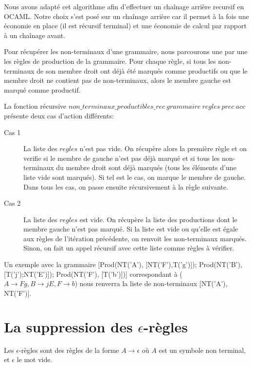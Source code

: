\documentclass[11pt,a4paper]{article}
\begin{document}
Nous avons adapté cet algorithme afin d'effectuer un chaînage arrière recursif en OCAML. Notre choix s'est posé sur un chaînage arrière car il permet à la fois une économie en place (il est récursif terminal) et une économie de calcul par rapport à un chaînage avant.
\newline

Pour récupérer les non-terminaux d'une grammaire, nous parcourons une par une les règles 
de production de la grammaire. Pour chaque règle, si tous les non-terminaux de son membre droit ont déjà  été marqués comme productifs ou que le membre droit ne contient pas de non-terminaux, alors le membre gauche est marqué comme productif.

La fonction récursive $non\_terminaux\_productibles\_rec\ grammaire\ regles\ prec\ acc$ présente deux cas d'action différents:

\begin{description}
    \item[Cas 1] La liste des $regles$ n'est pas vide. On récupère alors la première règle et on verifie si le membre de gauche n'est pas déjà marqué et si tous les non-terminaux du membre droit sont déjà marqués (tous les éléments d'une liste vide sont marqués). Si tel est le cas, on marque le membre de gauche. Dans tous les cas, on passe ensuite récursivement à la règle suivante.
    \item[Cas 2] La liste des $regles$ est vide. On récupère la liste des productions dont le membre gauche n'est pas marqué. Si la liste est vide ou qu'elle est égale aux règles de l'itération précédente, on renvoit les non-terminaux marqués. Sinon, on fait un appel récursif avec cette liste comme règles à vérifier.
\end{description}

Un exemple avec la grammaire
[Prod(NT('A'), [NT('F'),T('g')]);
 Prod(NT('B'), [T('j');NT('E')]);
 Prod(NT('F'), [T('b')])] 
correspondant à ($A \rightarrow Fg, B \rightarrow jE, F \rightarrow b$) nous renverra la liste de non-terminaux [NT('A'), NT('F')].

\newpage


\section{La suppression des $\epsilon$-règles}

Les $\epsilon$-règles sont des règles de la forme 
$A \rightarrow \epsilon$ où $A$ est un symbole non
terminal, et $\epsilon$ le mot vide.
\end{document}
